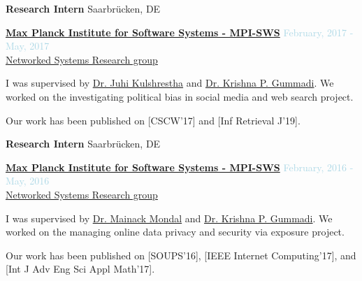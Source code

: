 \textbf{Research Intern} \hfill {Saarbrücken, DE}
\begin{outerlist}

\item[] \href{https://www.mpi-sws.org}{\textbf{Max Planck Institute for Software Systems - MPI-SWS}}  \hfill {\textcolor{lightblue}{February, 2017 - May, 2017}}
\\ \href{https://www.mpi-sws.org/research-areas/social-and-information-systems/}{Networked Systems Research group}  \medskip 

        \begin{innerlist}[-]
        \item I was supervised by \href{http://www.juhikulshrestha.com}{Dr. Juhi Kulshrestha} and \href{https://people.mpi-sws.org/~gummadi/}{Dr. Krishna P. Gummadi}. We worked on the investigating political bias in social media and web search project.
        \item Our work has been published on [CSCW'17] and [Inf Retrieval J'19].
        \end{innerlist}

\end{outerlist}

\medskip

\textbf{Research Intern} \hfill {Saarbrücken, DE}
\begin{outerlist}

\item[] \href{https://www.mpi-sws.org}{\textbf{Max Planck Institute for Software Systems - MPI-SWS}}  \hfill {\textcolor{lightblue}{February, 2016 - May, 2016}}
\\ \href{https://www.mpi-sws.org/research-areas/social-and-information-systems/}{Networked Systems Research group}  \medskip 

        \begin{innerlist}[-]
		\item I was supervised by \href{http://cse.iitkgp.ac.in/~mainack/}{Dr. Mainack Mondal} and \href{https://people.mpi-sws.org/~gummadi/}{Dr. Krishna P. Gummadi}. We worked on the managing online data privacy and security via exposure project.
		\item Our work has been published on [SOUPS'16], [IEEE Internet Computing'17], and [Int J Adv Eng Sci Appl Math'17].
        \end{innerlist}

\end{outerlist}

\medskip



